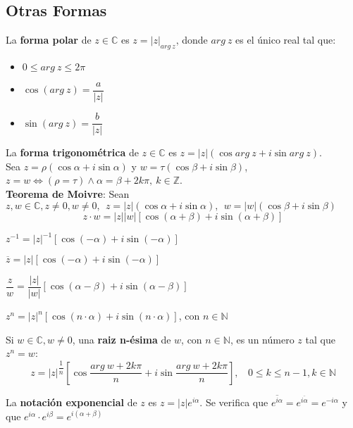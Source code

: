 \documentclass[11pt,a4paper]{article}
\begin{document}
\subsection{Otras Formas}
\noindent La \textbf{forma polar} de $z \in \mathbb{C}$ es $z = |z|_{arg\ z}$, donde $arg\ z$ es el \'unico real tal que:
\begin{multicols}{3}
\begin{itemize}
\item $0\leq arg\ z \leq 2\pi$
\item $\cos (arg\ z) = \dfrac{a}{|z|}$
\item $\sin (arg\ z) = \dfrac{b}{|z|}$
\end{itemize}
\end{multicols}

\noindent La \textbf{forma trigonom\'etrica} de $z \in \mathbb{C}$ es $z = |z| (\cos arg\ z + i \sin arg\ z)$.\\
\noindent Sea $z=\rho (\cos \alpha + i \sin \alpha)$ y $w = \tau (\cos \beta + i \sin \beta)$, $z=w \iff (\rho = \tau) \land \alpha = \beta + 2k\pi,\ k \in \mathbb{Z}$.\\

\noindent \textbf{Teorema de Moivre}: Sean $z,w \in \mathbb{C}, z\not=0, w\not=0,\ \ z=|z|(\cos \alpha + i \sin \alpha),\ \ w = |w| (\cos \beta + i \sin \beta)$
$$z \cdot w = |z||w|[\cos (\alpha + \beta) + i\sin(\alpha+\beta)]$$

\begin{itemize}
\begin{multicols}{2}
\item $z^{-1} = |z|^{-1}[\cos (-\alpha) + i \sin (-\alpha)]$
\item $\overline{z} = |z|[\cos (-\alpha) + i \sin (-\alpha)]$
\item $\dfrac{z}{w} = \dfrac{|z|}{|w|} [\cos (\alpha - \beta) + i \sin (\alpha - \beta)]$
\item $z^n = |z|^n [\cos (n\cdot\alpha) + i \sin (n\cdot\alpha)]$, con $n\in\mathbb{N}$
\end{multicols}
\end{itemize}

\noindent Si $w\in\mathbb{C}, w\not=0$, una \textbf{raiz n-\'esima} de $w$, con $n\in\mathbb{N}$, es un n\'umero $z$ tal que $z^n=w$:
$$z = |z|^{\dfrac{1}{n}} \left[\cos \dfrac{arg\ w + 2k\pi}{n} + i \sin \dfrac{arg\ w + 2k\pi}{n}\right], \ \ \ \ 0 \leq k \leq n-1, k \in \mathbb{N}$$

\noindent La \textbf{notaci\'on exponencial} de $z$ es $z=|z|e^{i\alpha}$. Se verifica que $\overline{e^{i\alpha}} = e^{\overline{i\alpha}} = e^{-i\alpha}$ y que $e^{i\alpha} \cdot e^{i\beta} = e^{i(\alpha+\beta)}$
\end{document}
